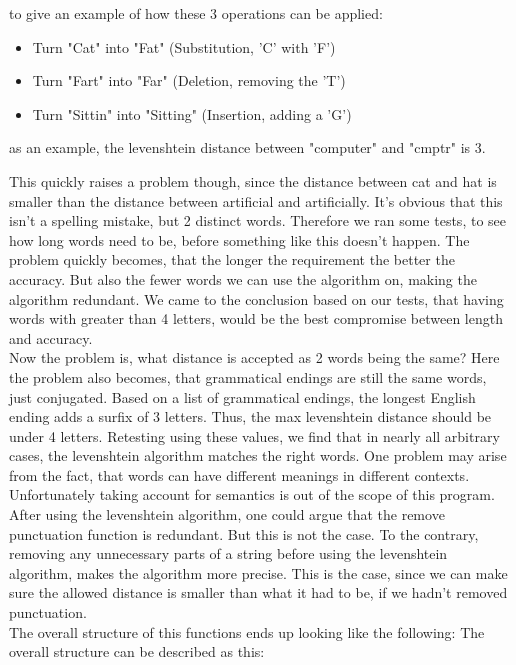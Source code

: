 to give an example of how these 3 operations can be applied:
\begin{itemize}
  \item Turn "Cat" into "Fat"  (Substitution, 'C' with 'F')
  \item Turn "Fart" into "Far"  (Deletion, removing the 'T')
  \item Turn "Sittin" into "Sitting"  (Insertion, adding a 'G')
\end{itemize}

as an example, the levenshtein distance between "computer" and "cmptr" is 3.

This quickly raises a problem though, since the distance between cat and hat is smaller than the distance
between artificial and artificially. 
It's obvious that this isn't a spelling mistake, but 2 distinct words. Therefore we ran
some tests, to see how long words need to be, before something like this doesn't happen. 
The problem quickly becomes, that the longer the requirement the better the accuracy. 
But also the fewer words we can use the algorithm on, making the algorithm redundant.
We came to the conclusion based on our tests, that having words with greater than 4 letters, would be
the best compromise between length and accuracy.
\\
Now the problem is, what distance is accepted as 2 words being the same?
Here the problem also becomes, that grammatical endings are still the same words, just conjugated.
Based on a list of grammatical endings, the longest English ending adds a surfix of 3 letters\cite{grammar_endings}. Thus,
the max levenshtein distance should be under 4 letters.
Retesting using these values, we find that in nearly all arbitrary cases, the levenshtein algorithm matches the right words.
One problem may arise from the fact, that words can have different meanings in different contexts. Unfortunately taking account for semantics is out of the scope of this program.
\\
After using the levenshtein algorithm, one could argue that the remove punctuation function is redundant. But this is not the case. To the contrary, removing any
unnecessary parts of a string before using the levenshtein algorithm, makes the algorithm more precise. This is the case, since we can make sure the allowed distance
is smaller than what it had to be, if we hadn't removed punctuation.
\\
The overall structure of this functions ends up looking like the following: %
\newpage
The overall structure can be described as this:
